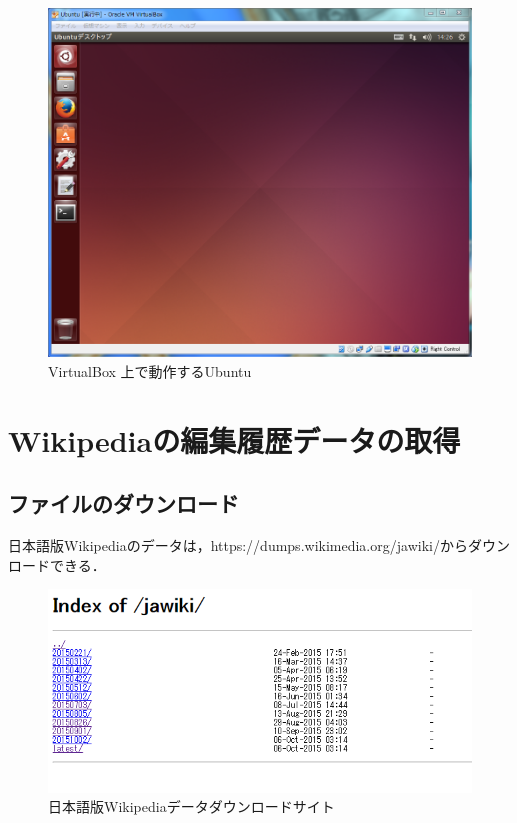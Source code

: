 \begin{figure}[H]
\centering
\includegraphics[width=14cm]{Ubuntu_on_VirtualBox.PNG}
\caption{VirtualBox 上で動作するUbuntu}\label{サンプル図}
\end{figure}


\section{Wikipediaの編集履歴データの取得}

\subsection{ファイルのダウンロード}

日本語版Wikipediaのデータは，https://dumps.wikimedia.org/jawiki/からダウンロードできる．

\begin{figure}[H]
\centering
\includegraphics[width=14cm]{Index_of_jawiki.PNG}
\caption{日本語版Wikipediaデータダウンロードサイト}\label{サンプル図}
\end{figure}

